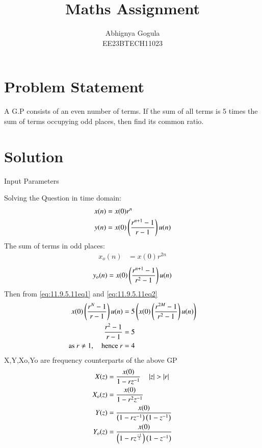 \documentclass[journal,12pt,twocolumn]{IEEEtran}
\theoremstyle{remark}
\begin{document}

\title{Maths Assignment}
\author{Abhignya Gogula\\
        EE23BTECH11023}
\maketitle
\section*{Problem Statement}
A G.P consists of an even number of terms. If the sum of all terms is 5 times the sum of terms occupying odd places, then find its common ratio.
\section*{Solution}
\begin{table}[h!]
\centering

\caption{Input Parameters}
\label{11.9.5.11tab1}
\end{table}
Solving the Question in time domain:
\begin{align}
x(n) &= x(0)r^{n} \\
y(n) &= x(0)\left(\frac{r^{n+1}-1}{r-1}\right)u(n)
\label{eq:11.9.5.11eq1}
\end{align}
The sum of terms in odd places:
\begin{align}
x_o(n) &= x(0)r^{2n}
\end{align}
\begin{equation}
y_o(n)= x(0)\left(\frac{r^{n+1}-1}{r^2-1}\right)u(n)
\label{eq:11.9.5.11eq2}
\end{equation}
Then from \eqref{eq:11.9.5.11eq1} and \eqref{eq:11.9.5.11eq2}
\begin{align}
x(0)\left(\frac{r^{N}-1}{r-1}\right)u(n) &= 5\left(x(0)\left(\frac{r^{2M}-1}{r^2-1}\right)u(n)\right)\\
\frac{r^2-1}{r-1} &= 5\\
\text{as } r \neq 1, \quad \text{hence } r &= 4\\
\end{align}
X,Y,Xo,Yo are frequency counterparts of the above GP
\begin{align}
X(z) &= \frac{x(0)}{1-rz^{-1}} \quad \left\vert z\right\vert > \left\vert r\right\vert\\ 
X_o(z) &= \frac{x(0)}{1-r^{2}z^{-1}}\\
Y(z) &= \frac{x(0)}{\left(1-rz^{-1}\right)\left(1-z^{-1}\right)}\\
Y_o(z) &= \frac{x(0)}{\left(1-rz^{\frac{-1}{2}}\right)\left(1-z^{-1}\right)}
\end{align}
\end{document}

